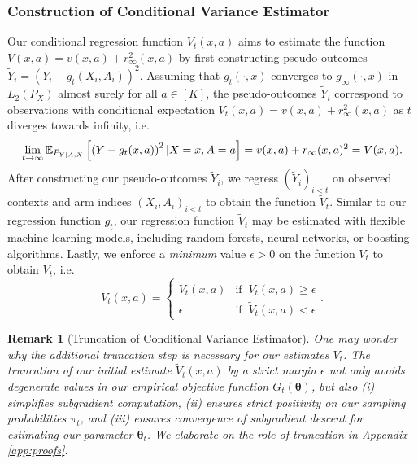 \documentclass{article}
\newtheorem{remark}{Remark}
\begin{document}
\subsubsection{Construction of Conditional Variance Estimator}

Our conditional regression function $V_t(x,a)$ aims to estimate the function $V(x,a) = v(x,a) + r_\infty^2(x,a)$ by first constructing pseudo-outcomes $\tilde{Y}_i = (Y_i - g_t(X_i, A_i))^2$. Assuming that $g_t(\cdot, x)$ converges to $g_\infty(\cdot, x)$ in $L_2(P_X)$ almost surely for all $a \in [K]$, the pseudo-outcomes $\tilde{Y}_i$ correspond to observations with conditional expectation $V_t(x,a)= v(x,a) + r_\infty^2(x,a)$ as $t$ diverges towards infinity, i.e. 
\begin{align}
    \lim_{t \rightarrow \infty}\mathbb{E}_{P_{Y|A,X}}\left[\left(Y - g_t(x,a)\right)^2 | X=x, A=a\right] = v(x,a) + r_\infty(x,a)^2 = V(x,a).
\end{align}
After constructing our pseudo-outcomes $\tilde{Y}_i$, we regress $(\tilde{Y}_i)_{i < t}$ on observed contexts and arm indices $(X_i, A_i)_{i < t}$ to obtain the function $\tilde{V}_t$. Similar to our regression function $g_t$, our regression function $\tilde{V}_t$ may be estimated with flexible machine learning models, including random forests, neural networks, or boosting algorithms. Lastly, we enforce a \textit{minimum} value $\epsilon > 0$ on the function $\tilde{V}_t$ to obtain $V_t$, i.e. 
\begin{equation}
    V_t(x,a) = \begin{cases}\tilde{V}_t(x,a) & \text{if } \  \tilde{V}_t(x,a) \geq \epsilon \\ \epsilon  & \text{if } \ \tilde{V}_t(x,a) < \epsilon \end{cases}.
\end{equation}

\begin{remark}[Truncation of Conditional Variance Estimator]
    One may wonder why the additional truncation step is necessary for our estimates $V_t$. The truncation of our initial estimate $\tilde{V}_t(x,a)$ by a strict margin $\epsilon$ not only avoids degenerate values in our empirical objective function $G_t(\bm\theta)$, but also (i) simplifies subgradient computation, (ii) ensures strict positivity on our sampling probabilities $\pi_t$, and (iii) ensures convergence of subgradient descent for estimating our parameter $\bm{\theta}_t$. We elaborate on the role of truncation in Appendix \ref{app:proofs}.
\end{remark}
\end{document}
